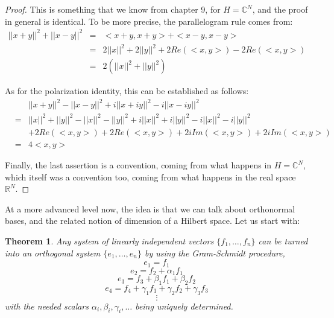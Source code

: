 \documentclass[12pt]{amsbook}
\newtheorem{theorem}{Theorem}[chapter]
\begin{document}
\begin{proof}
This is something that we know from chapter 9, for $H=\mathbb C^N$, and the proof in general is identical. To be more precise, the parallelogram rule comes from:
\begin{eqnarray*}
||x+y||^2+||x-y||^2
&=&<x+y,x+y>+<x-y,x-y>\\
&=&2||x||^2+2||y||^2+2Re(<x,y>)-2Re(<x,y>)\\
&=&2(||x||^2+||y||^2)
\end{eqnarray*}

As for the polarization identity, this can be established as follows:
\begin{eqnarray*}
&&||x+y||^2-||x-y||^2+i||x+iy||^2-i||x-iy||^2\\
&=&||x||^2+||y||^2-||x||^2-||y||^2+i||x||^2+i||y||^2-i||x||^2-i||y||^2\\
&&+2Re(<x,y>)+2Re(<x,y>)+2iIm(<x,y>)+2iIm(<x,y>)\\
&=&4<x,y>
\end{eqnarray*}

Finally, the last assertion is a convention, coming from what happens in $H=\mathbb C^N$, which itself was a convention too, coming from what happens in the real space $\mathbb R^N$.
\end{proof}

At a more advanced level now, the idea is that we can talk about orthonormal bases, and the related notion of dimension of a Hilbert space. Let us start with:

\begin{theorem}
Any system of linearly independent vectors $\{f_1,\ldots,f_n\}$ can be turned into an orthogonal system $\{e_1,\ldots,e_n\}$ by using the Gram-Schmidt procedure,
$$e_1=f_1$$
$$e_2=f_2+\alpha_1f_1$$
$$e_3=f_3+\beta_1f_1+\beta_2f_2$$
$$e_4=f_4+\gamma_1f_1+\gamma_2f_2+\gamma_3f_3$$
$$\vdots$$
with the needed scalars $\alpha_i,\beta_i,\gamma_i,\ldots$ being uniquely determined.
\end{theorem}
\end{document}
